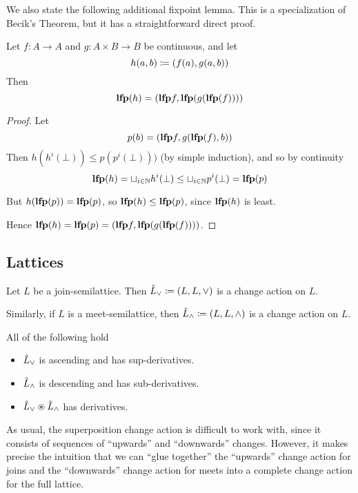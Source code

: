 We also state the following additional fixpoint lemma. This is a specialization of
Becik's Theorem\autocite[][section 10.1]{winskel1993formal}, but it has a straightforward direct proof.

\begin{prop}
  \label{prop:factoringFixpoints}
  Let $f : A \rightarrow A$ and $g: A \times B \rightarrow B$ be continuous, and let
  $$h(a, b) \coloneqq (f(a), g(a, b))$$
  Then
  $$\textbf{lfp}(h) = (\textbf{lfp} f, \textbf{lfp}(g(\textbf{lfp}(f))))$$
\end{prop}
\ifproofs
\begin{proof}
  Let $$p(b) = (\textbf{lfp} f, g(\textbf{lfp}(f), b))$$
  Then $h(h^i(\bot)) \leq p(p^i(\bot)))$ (by simple induction), and so by continuity
  $$\textbf{lfp}(h) = \sqcup_{i \in \mathbb{N}} h^i(\bot) \leq \sqcup_{i \in \mathbb{N}} p^i(\bot) = \textbf{lfp}(p)$$

  But $h(\textbf{lfp}(p)) = \textbf{lfp}(p)$, so $\textbf{lfp}(h) \leq \textbf{lfp}(p)$, since $\textbf{lfp}(h)$ is least.

  Hence $\textbf{lfp}(h) = \textbf{lfp}(p) = (\textbf{lfp} f, \textbf{lfp}(g(\textbf{lfp}(f))))$.
\end{proof}
\fi

\subsection{Lattices}

\begin{defn}
  Let $L$ be a join-semilattice. Then $\hat{L}_\vee \coloneqq (L,L,\vee)$ is a change
  action on $L$.

  Similarly, if $L$ is a meet-semilattice, then $\hat{L}_\wedge \coloneqq (L,L,\wedge)$ is a change
  action on $L$.
\end{defn}

\begin{prop}
  All of the following hold
  \begin{itemize}
    \item $\hat{L}_\vee$ is ascending and has sup-derivatives.
    \item $\hat{L}_\wedge$ is descending and has sub-derivatives.
    \item $\hat{L}_\vee \circledast \hat{L}_\wedge$ has derivatives.
  \end{itemize}
\end{prop}

As usual, the superposition change action is difficult to work with, since it
consists of sequences of ``upwards'' and ``downwards'' changes. However, it
makes precise the intuition that we can ``glue together'' the ``upwards'' change
action for joins and the ``downwards'' change action for meets into a
complete change action for the full lattice.

